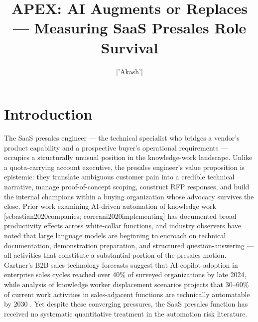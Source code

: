 \documentclass[10pt, conference]{IEEEtran}
\title{APEX: AI Augments or Replaces — Measuring SaaS Presales Role Survival}
\author{['Akash']}
\begin{document}
\begin{abstract}

\end{abstract}

\maketitle
\begin{abstract}

\end{abstract}

\section{Introduction}

\label{sec:introduction}

The SaaS presales engineer --- the technical specialist who bridges a vendor's product capability and a prospective buyer's operational requirements --- occupies a structurally unusual position in the knowledge-work landscape. Unlike a quota-carrying account executive, the presales engineer's value proposition is epistemic: they translate ambiguous customer pain into a credible technical narrative, manage proof-of-concept scoping, construct RFP responses, and build the internal champions within a buying organization whose advocacy survives the close. Prior work examining AI-driven automation of knowledge work [sebastian2020companies; correani2020implementing] has documented broad productivity effects across white-collar functions, and industry observers have noted that large language models are beginning to encroach on technical documentation, demonstration preparation, and structured question-answering --- all activities that constitute a substantial portion of the presales motion. Gartner's B2B sales technology forecasts suggest that AI copilot adoption in enterprise sales cycles reached over 40\% of surveyed organizations by late 2024, while analysis of knowledge worker displacement scenarios projects that 30--60\% of current work activities in sales-adjacent functions are technically automatable by 2030 \cite{johnk2020ready}. Yet despite these converging pressures, the SaaS presales function has received no systematic quantitative treatment in the automation risk literature.
\end{document}
